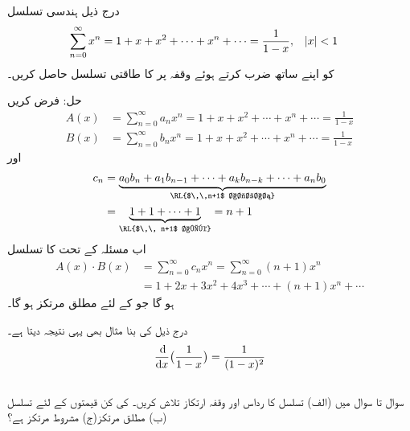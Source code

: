  درج ذیل ہندسی تسلسل
\begin{align*}
\sum_{n=0}^{\infty}x^n&=1+x+x^2+\cdots+x^n+\cdots=\frac{1}{1-x},&&\abs{x}<1
\end{align*}
کو اپنے ساتھ ضرب کرتے ہوئے وقفہ  پر  کا طاقتی تسلسل حاصل کریں۔

حل:\quad
فرض کریں
\begin{align*}
A(x)&=\sum_{n=0}^{\infty}a_nx^n=1+x+x^2+\cdots+x^n+\cdots=\frac{1}{1-x}\\
B(x)&=\sum_{n=0}^{\infty}b_nx^n=1+x+x^2+\cdots+x^n+\cdots=\frac{1}{1-x}
\end{align*}
اور
\begin{align*}
c_n&=\underbrace{a_0b_n+a_1b_{n-1}+\cdots+a_kb_{n-k}+\cdots+a_nb_0}_{\text{\RL{$\,\,n+1$ اجزاء}}}\\
&=\underbrace{1+1+\cdots+1}_{\text{\RL{$\,\, n+1$ ایک}}}=n+1
\end{align*}
اب مسئلہ  کے تحت  کا تسلسل
\begin{align*}
A(x)\cdot B(x)&=\sum_{n=0}^{\infty}c_nx^n=\sum_{n=0}^{\infty}(n+1)x^n\\
&=1+2x+3x^2+4x^3+\cdots+(n+1)x^n+\cdots
\end{align*}
ہو گا جو  کے لئے  مطلق مرتکز ہو گا۔

درج ذیل کی بنا مثال  بھی یہی نتیجہ دیتا ہے۔
\begin{align*}
\frac{\dif}{\dif x}\big(\frac{1}{1-x}\big)=\frac{1}{(1-x)^2}
\end{align*}
\\
سوال  تا سوال  میں (الف) تسلسل کا رداس اور وقفہ ارتکاز تلاش کریں۔   کی کن قیمتوں کے لئے تسلسل (ب) مطلق مرتکز(ج) مشروط مرتکز ہے؟


